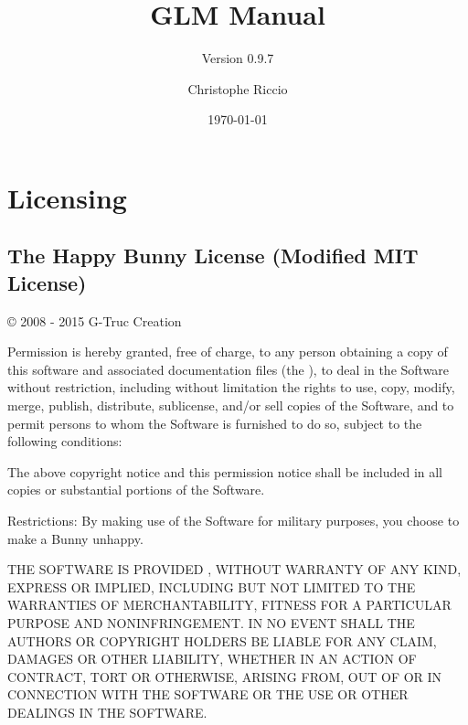 \documentclass{scrartcl}
\numberwithin{figure}{subsection}
\begin{document}
\newcommand{\glmheader}[1]{\href{https://github.com/g-truc/glm/tree/master/glm/#1.hpp}{\texttt{<glm/#1.hpp>}}}
\newcommand{\glmemail}[1]{\href{mailto://glm@g-truc.net}{#1}}
\newcommand{\glufunction}[1]{\href{https://www.opengl.org/sdk/docs/man2/xhtml/#1.xml}{\texttt{#1}}}
\newcommand{\glfunction}[2]{\href{http://docs.gl/gl#1/#2}{\texttt{#2}}}

\author{Christophe Riccio}
\subtitle{Version 0.9.7}

\title{GLM Manual}
\date{\today{}} %

\maketitle{} %

\pagebreak{}

\section*{Licensing}

\subsection*{\hypertarget{happybunny}{The Happy Bunny License (Modified MIT License)}}

\copyright{} 2008 - 2015 G-Truc Creation

Permission is hereby granted, free of charge, to any person obtaining a copy of this software and associated documentation files (the ), to deal in the Software without restriction, including without limitation the rights to use, copy, modify, merge, publish, distribute, sublicense, and/or sell copies of the Software, and to permit persons to whom the Software is furnished to do so, subject to the following conditions:

The above copyright notice and this permission notice shall be included in all copies or substantial portions of the Software.

Restrictions: By making use of the Software for military purposes, you choose to make a Bunny unhappy.

THE SOFTWARE IS PROVIDED , WITHOUT WARRANTY OF ANY KIND, EXPRESS OR IMPLIED, INCLUDING BUT NOT LIMITED TO THE WARRANTIES OF MERCHANTABILITY, FITNESS FOR A PARTICULAR PURPOSE AND NONINFRINGEMENT. IN NO EVENT SHALL THE AUTHORS OR COPYRIGHT HOLDERS BE LIABLE FOR ANY CLAIM, DAMAGES OR OTHER LIABILITY, WHETHER IN AN ACTION OF CONTRACT, TORT OR OTHERWISE, ARISING FROM, OUT OF OR IN CONNECTION WITH THE SOFTWARE OR THE USE OR OTHER DEALINGS IN THE SOFTWARE.
\end{document}
